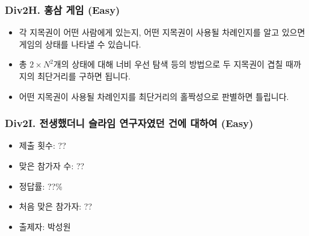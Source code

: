 \documentclass[xetex]{beamer}
\begin{document}
\begin{frame}
  \frametitle{Div2H. 홍삼 게임 (Easy)}
  \begin{itemize}
    \item 각 지목권이 어떤 사람에게 있는지, 어떤 지목권이 사용될 차례인지를 알고 있으면 게임의 상태를 나타낼 수 있습니다.
    \item 총 $2 \times N^{2}$개의 상태에 대해 너비 우선 탐색 등의 방법으로 두 지목권이 겹칠 때까지의 최단거리를 구하면 됩니다.
    \item 어떤 지목권이 사용될 차례인지를 최단거리의 홀짝성으로 판별하면 틀립니다.
  \end{itemize}
\end{frame}

\begin{frame}
  \frametitle{Div2I. 전생했더니 슬라임 연구자였던 건에 대하여 (Easy)}
  \begin{itemize}
    \item 제출 횟수: ??
    \item 맞은 참가자 수: ??
    \item 정답률: ??\%
    \item 처음 맞은 참가자: ??
    \item 출제자: 박성원
  \end{itemize}
\end{frame}
\end{document}
